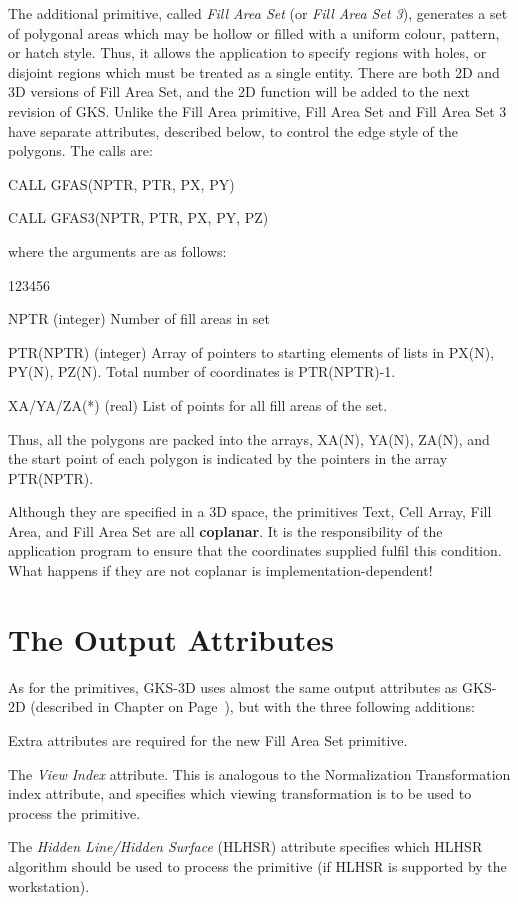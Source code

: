 The additional primitive, called {\it Fill Area Set}
(or {\it Fill Area Set 3}), generates a set of polygonal
areas which may be hollow or filled with a uniform colour,
pattern, or hatch style.
Thus, it allows the application to specify regions with holes,
or disjoint regions which must be treated as a single entity.
There are both 2D and 3D versions of Fill Area Set, and the
2D function will be added to the next revision of GKS.
Unlike the Fill Area primitive, Fill Area Set and Fill Area Set 3
have separate attributes, described below, to control the edge
style of the polygons.
The calls are:
\begin{XMP}
CALL GFAS(NPTR, PTR, PX, PY)
 
CALL GFAS3(NPTR, PTR, PX, PY, PZ)
\end{XMP}
where the arguments are as follows:
\begin{DLtt}{123456}
\item[NPTR]
(integer) Number of fill areas in set
\item[PTR(NPTR)]
(integer) Array of pointers to starting elements of lists in
PX(N), PY(N), PZ(N). Total number of coordinates is PTR(NPTR)-1.
\item[XA/YA/ZA(*)]
(real) List of points for all fill areas of the set.
\end{DLtt}
Thus, all the polygons are packed into the arrays, XA(N), YA(N), ZA(N),
and the start point of each polygon is indicated by the pointers in
the array PTR(NPTR).
 
\begin{note}
Although they are specified in a 3D space, the primitives Text,
Cell Array, Fill Area, and Fill Area Set are all {\bf coplanar}.
It is the responsibility of the application program to ensure that the
coordinates supplied fulfil this condition.
What happens if they are not coplanar is implementation-dependent!
\end{note}
\section{The Output Attributes}
 
As for the primitives, GKS-3D uses almost the same output attributes as
GKS-2D (described in Chapter on Page~\pageref{sec:attrbs}), but with the
three following additions:
\begin{OL}
\item Extra attributes are required for the new Fill Area Set primitive.
\item The {\it View Index} attribute.
This is analogous to the Normalization Transformation index attribute,
and specifies which viewing transformation is to be used to process
the primitive.
\item The {\it Hidden Line/Hidden Surface} (HLHSR) attribute specifies
which HLHSR algorithm should be used to process the primitive
(if HLHSR is supported by the workstation).
\end{OL}
 

